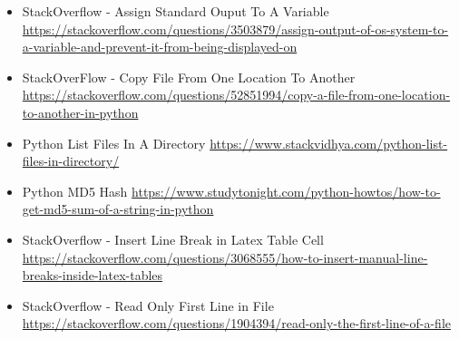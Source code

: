 \documentclass[12pt]{article}
\begin{document}
\begin{itemize}
    \item{StackOverflow - Assign Standard Ouput To A Variable} \url{https://stackoverflow.com/questions/3503879/assign-output-of-os-system-to-a-variable-and-prevent-it-from-being-displayed-on}
    \item{StackOverFlow - Copy File From One Location To Another} \url{https://stackoverflow.com/questions/52851994/copy-a-file-from-one-location-to-another-in-python}
    \item{Python List Files In A Directory} \url{https://www.stackvidhya.com/python-list-files-in-directory/}
    \item{Python MD5 Hash} \url{https://www.studytonight.com/python-howtos/how-to-get-md5-sum-of-a-string-in-python}
    \item{StackOverflow - Insert Line Break in Latex Table Cell} \url{https://stackoverflow.com/questions/3068555/how-to-insert-manual-line-breaks-inside-latex-tables}
    \item{StackOverflow - Read Only First Line in File} \url{https://stackoverflow.com/questions/1904394/read-only-the-first-line-of-a-file}
\end{itemize}
\end{document}

